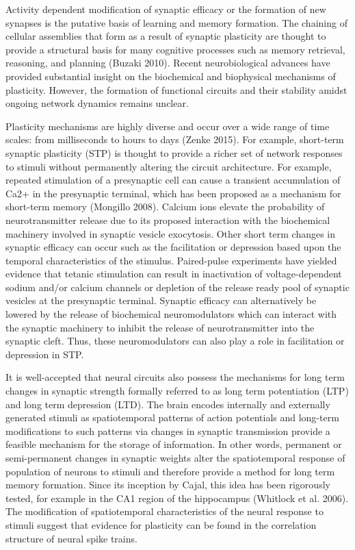 \documentclass{ucetd}
\begin{document}
Activity dependent modification of synaptic efficacy or the formation of new synapses is the putative basis of learning and memory formation. The chaining of cellular assemblies that form as a result of synaptic plasticity are thought to provide a structural basis for many cognitive processes such as memory retrieval, reasoning, and planning (Buzaki 2010). Recent neurobiological advances have provided substantial insight on the biochemical and biophysical mechanisms of plasticity. However, the formation of functional circuits and their stability amidst ongoing network dynamics remains unclear.

Plasticity mechanisms are highly diverse and occur over a wide range of time scales: from milliseconds to hours to days (Zenke 2015). For example, short-term synaptic plasticity (STP) is thought to provide a richer set of network responses to stimuli without permanently altering the circuit architecture. For example, repeated stimulation of a presynaptic cell can cause a transient accumulation of Ca2+ in the presynaptic terminal, which has been proposed as a mechanism for short-term memory (Mongillo 2008). Calcium ions elevate the probability of neurotransmitter release due to its proposed interaction with the biochemical machinery involved in synaptic vesicle exocytosis. Other short term changes in synaptic efficacy can occur such as the facilitation or depression based upon the temporal characteristics of the stimulus. Paired-pulse experiments have yielded evidence that tetanic stimulation can result in inactivation of voltage-dependent sodium and/or calcium channels or depletion of the release ready pool of synaptic vesicles at the presynaptic terminal. Synaptic efficacy can alternatively be lowered by the release of biochemical neuromodulators which can interact with the synaptic machinery to inhibit the release of neurotransmitter into the synaptic cleft. Thus, these neuromodulators can also play a role in facilitation or depression in STP.

It is well-accepted that neural circuits also possess the mechanisms for long term changes in synaptic strength formally referred to as long term potentiation (LTP) and long term depression (LTD). The brain encodes internally and externally generated stimuli as spatiotemporal patterns of action potentials and long-term modifications to such patterns via changes in synaptic transmission provide a feasible mechanism for the storage of information. In other words, permanent or semi-permanent changes in synaptic weights alter the spatiotemporal response of population of neurons to stimuli and therefore provide a method for long term memory formation. Since its inception by Cajal, this idea has been rigorously tested, for example in the CA1 region of the hippocampus (Whitlock et al. 2006). The modification of spatiotemporal characteristics of the neural response to stimuli suggest that evidence for plasticity can be found in the correlation structure of neural spike trains.
\end{document}
